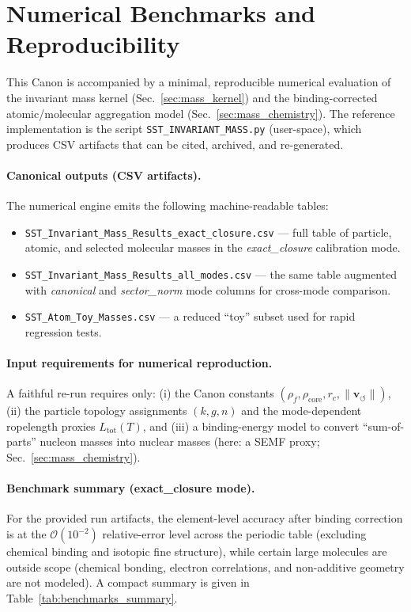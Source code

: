\documentclass[10pt]{article}
\begin{document}
\section{Numerical Benchmarks and Reproducibility}
\label{app:benchmarks}

This Canon is accompanied by a minimal, reproducible numerical evaluation of the invariant mass kernel (Sec.~\ref{sec:mass_kernel}) and the binding-corrected atomic/molecular aggregation model (Sec.~\ref{sec:mass_chemistry}). The reference implementation is the script \texttt{SST\_INVARIANT\_MASS.py} (user-space), which produces CSV artifacts that can be cited, archived, and re-generated.

\paragraph{Canonical outputs (CSV artifacts).}
The numerical engine emits the following machine-readable tables:
\begin{itemize}
    \item \texttt{SST\_Invariant\_Mass\_Results\_exact\_closure.csv} --- full table of particle, atomic, and selected molecular masses in the \emph{exact\_closure} calibration mode.
    \item \texttt{SST\_Invariant\_Mass\_Results\_all\_modes.csv} --- the same table augmented with \emph{canonical} and \emph{sector\_norm} mode columns for cross-mode comparison.
    \item \texttt{SST\_Atom\_Toy\_Masses.csv} --- a reduced ``toy'' subset used for rapid regression tests.
\end{itemize}

\paragraph{Input requirements for numerical reproduction.}
A faithful re-run requires only:
(i) the Canon constants \((\rho_{\!f}, \rho_{\text{core}}, r_c, \lVert \mathbf{v}_{\!\boldsymbol{\circlearrowleft}}\rVert)\),
(ii) the particle topology assignments \((k,g,n)\) and the mode-dependent ropelength proxies \(L_{\text{tot}}(T)\),
and (iii) a binding-energy model to convert ``sum-of-parts'' nucleon masses into nuclear masses (here: a SEMF proxy; Sec.~\ref{sec:mass_chemistry}).

\paragraph{Benchmark summary (exact\_closure mode).}
For the provided run artifacts, the element-level accuracy after binding correction is at the \(\mathcal{O}(10^{-2})\) relative-error level across the periodic table (excluding chemical binding and isotopic fine structure), while certain large molecules are outside scope (chemical bonding, electron correlations, and non-additive geometry are not modeled). A compact summary is given in Table~\ref{tab:benchmarks_summary}.
\end{document}
